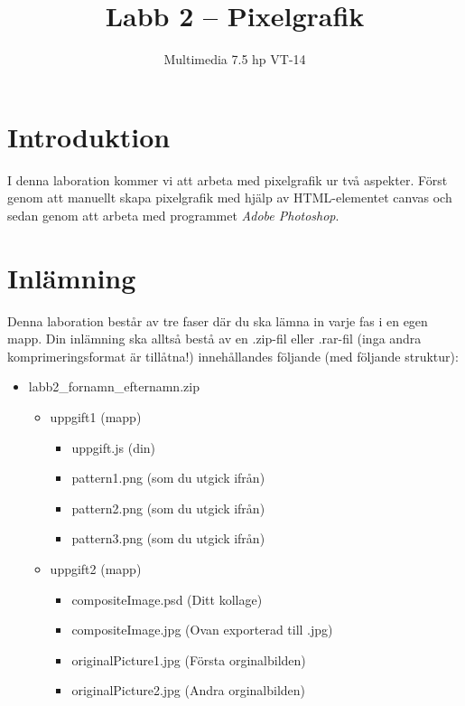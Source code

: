 \documentclass[12pt]{article}
\date{}
\title{ Labb 2 -- Pixelgrafik }
\author{ Multimedia 7.5 hp VT-14 }
\begin{document}
\maketitle
\vspace{-2em}



\section{Introduktion}
I denna laboration kommer vi att arbeta med pixelgrafik ur två aspekter. Först genom att manuellt skapa pixelgrafik med hjälp av HTML-elementet canvas och sedan genom att arbeta med programmet \emph{Adobe Photoshop}.

\section{Inlämning}
Denna laboration består av tre faser där du ska lämna in varje fas i en egen mapp. Din inlämning ska alltså bestå av en .zip-fil eller .rar-fil (inga andra komprimeringsformat är tillåtna!) innehållandes följande (med följande struktur):
  \begin{itemize}
    \item labb2\_fornamn\_efternamn.zip

      \begin{itemize}
        \item uppgift1 (mapp)
          \begin{itemize}
            \item uppgift.js (din)
            \item pattern1.png (som du utgick ifrån)
            \item pattern2.png (som du utgick ifrån)
            \item pattern3.png (som du utgick ifrån)
          \end{itemize}

        \item uppgift2 (mapp)
          \begin{itemize}
	    \item compositeImage.psd (Ditt kollage)
            \item compositeImage.jpg (Ovan exporterad till .jpg)
            \item originalPicture1.jpg (Första orginalbilden)
            \item originalPicture2.jpg (Andra orginalbilden)
          \end{itemize}
    \end{itemize}
  \end{itemize}
\end{document}
